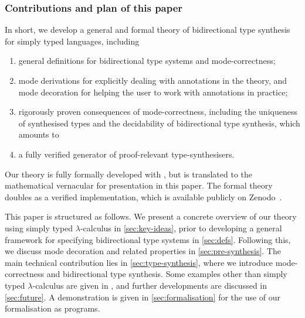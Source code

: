 \subsubsection{Contributions and plan of this paper}

%
In short, we develop a general and formal theory of bidirectional type synthesis for simply typed languages, including 
\begin{enumerate}
  \item general definitions for bidirectional type systems and mode-correctness;
  \item mode derivations for explicitly dealing with annotations in the theory, and mode decoration for helping the user to work with annotations in practice;
  \item rigorously proven consequences of mode-correctness, including the uniqueness of synthesised types and the decidability of bidirectional type synthesis, which amounts to
  \item a fully verified generator of proof-relevant type-synthesisers.
\end{enumerate}
Our theory is fully formally developed with \Agda, but is translated to the mathematical vernacular for presentation in this paper.
The formal theory doubles as a verified implementation, which is available publicly on Zenodo~\cite{Chen2024a}.


This paper is structured as follows.
We present a concrete overview of our theory using simply typed $\lambda$-calculus in \cref{sec:key-ideas}, prior to developing a general framework for specifying bidirectional type systems in \cref{sec:defs}.
Following this, we discuss mode decoration and related properties in \cref{sec:pre-synthesis}.
The main technical contribution lies in \cref{sec:type-synthesis}, where we introduce mode-correctness and bidirectional type synthesis.
Some examples other than simply typed $\lambda$-calculus are given in , and further developments are discussed in \cref{sec:future}.
\ifarxiv
A demonstration is given in \cref{sec:formalisation} for the use of our \Agda formalisation as programs.
\fi
